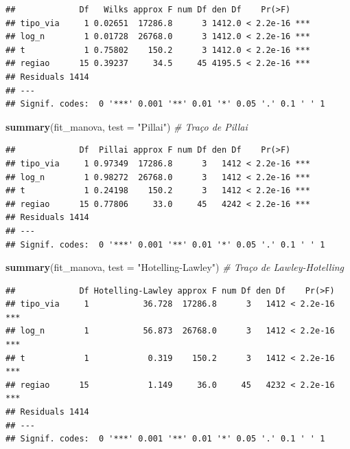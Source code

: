 \documentclass[
  11pt,
]{article}
\newenvironment{Shaded}{\begin{snugshade}}{\end{snugshade}}
\newcommand{\AttributeTok}[1]{\textcolor[rgb]{0.13,0.29,0.53}{#1}}
\newcommand{\CommentTok}[1]{\textcolor[rgb]{0.56,0.35,0.01}{\textit{#1}}}
\newcommand{\FunctionTok}[1]{\textcolor[rgb]{0.13,0.29,0.53}{\textbf{#1}}}
\newcommand{\NormalTok}[1]{#1}
\newcommand{\StringTok}[1]{\textcolor[rgb]{0.31,0.60,0.02}{#1}}
\begin{document}
\begin{verbatim}
##             Df   Wilks approx F num Df den Df    Pr(>F)    
## tipo_via     1 0.02651  17286.8      3 1412.0 < 2.2e-16 ***
## log_n        1 0.01728  26768.0      3 1412.0 < 2.2e-16 ***
## t            1 0.75802    150.2      3 1412.0 < 2.2e-16 ***
## regiao      15 0.39237     34.5     45 4195.5 < 2.2e-16 ***
## Residuals 1414                                             
## ---
## Signif. codes:  0 '***' 0.001 '**' 0.01 '*' 0.05 '.' 0.1 ' ' 1
\end{verbatim}

\begin{Shaded}
\begin{Highlighting}[]
\FunctionTok{summary}\NormalTok{(fit\_manova, }\AttributeTok{test =} \StringTok{"Pillai"}\NormalTok{)            }\CommentTok{\# Traço de Pillai}
\end{Highlighting}
\end{Shaded}

\begin{verbatim}
##             Df  Pillai approx F num Df den Df    Pr(>F)    
## tipo_via     1 0.97349  17286.8      3   1412 < 2.2e-16 ***
## log_n        1 0.98272  26768.0      3   1412 < 2.2e-16 ***
## t            1 0.24198    150.2      3   1412 < 2.2e-16 ***
## regiao      15 0.77806     33.0     45   4242 < 2.2e-16 ***
## Residuals 1414                                             
## ---
## Signif. codes:  0 '***' 0.001 '**' 0.01 '*' 0.05 '.' 0.1 ' ' 1
\end{verbatim}

\begin{Shaded}
\begin{Highlighting}[]
\FunctionTok{summary}\NormalTok{(fit\_manova, }\AttributeTok{test =} \StringTok{"Hotelling{-}Lawley"}\NormalTok{)  }\CommentTok{\# Traço de Lawley{-}Hotelling}
\end{Highlighting}
\end{Shaded}

\begin{verbatim}
##             Df Hotelling-Lawley approx F num Df den Df    Pr(>F)    
## tipo_via     1           36.728  17286.8      3   1412 < 2.2e-16 ***
## log_n        1           56.873  26768.0      3   1412 < 2.2e-16 ***
## t            1            0.319    150.2      3   1412 < 2.2e-16 ***
## regiao      15            1.149     36.0     45   4232 < 2.2e-16 ***
## Residuals 1414                                                      
## ---
## Signif. codes:  0 '***' 0.001 '**' 0.01 '*' 0.05 '.' 0.1 ' ' 1
\end{verbatim}
\end{document}
